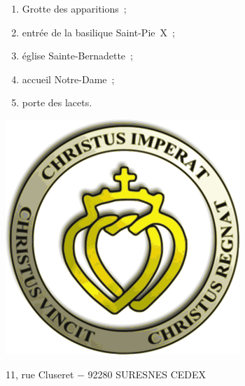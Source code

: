 \documentclass[%
a5paper%
,11pt%
,DIV=15%
,titlepage=on%
,headings=optiontoheadandtoc%
,headings=small%
,parskip=false%
,titlepage%
,openany%
]{scrbook}
\begin{document}
\vfill
{\centering\parbox{.6\textwidth}{%
\begin{enumerate}
\item Grotte des apparitions ;
\item entrée de la basilique Saint-Pie X ;
\item église Sainte-Bernadette ;
\item accueil Notre-Dame ;
\item porte des lacets.
\end{enumerate}%
}\par
}
\vfill
\clearpage

{\thispagestyle{empty}\centering
{}

\includegraphics[width=.3\textwidth]{img/fsspx}


\footnotesize 11, rue Cluseret − 92280 SURESNES CEDEX\par}
\end{document}
